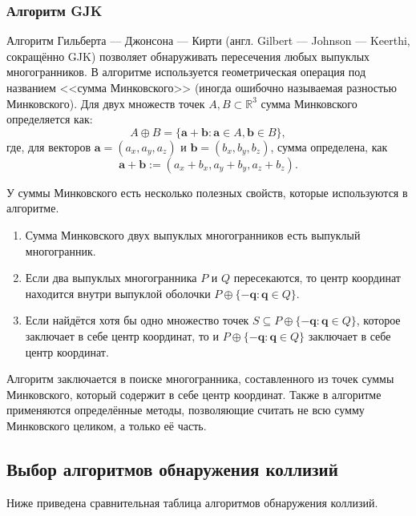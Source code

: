 \subsubsection{Алгоритм GJK}

Алгоритм Гильберта --- Джонсона --- Кирти (англ. Gilbert --- Johnson --- Keerthi, сокращённо GJK) позволяет обнаруживать пересечения любых выпуклых многогранников.
В алгоритме используется геометрическая операция под названием <<сумма Минковского>> (иногда ошибочно называемая разностью Минковского). %
Для двух множеств точек $A, B \subset \mathbb{R}^3$ сумма Минковского определяется как:
$$
A \oplus B = \{ \boldsymbol{a} + \boldsymbol{b} : \boldsymbol{a} \in A, \boldsymbol{b} \in B \},
$$
где, для векторов $\boldsymbol{a} = (a_x, a_y, a_z)$ и $\boldsymbol{b} = (b_x, b_y, b_z)$, сумма определена, как
$$
\boldsymbol{a} + \boldsymbol{b} := (a_x + b_x, a_y + b_y, a_z + b_z).
$$

У суммы Минковского есть несколько полезных свойств, которые используются в алгоритме.
\begin{enumerate}
    \item Сумма Минковского двух выпуклых многогранников есть выпуклый многогранник.
    \item Если два выпуклых многогранника $P$ и $Q$ пересекаются, то центр координат находится внутри выпуклой оболочки $P \oplus \{ -\boldsymbol{q} : \boldsymbol{q} \in Q \}$.
    \item Если найдётся хотя бы одно множество точек $S \subseteq P \oplus \{ -\boldsymbol{q} : \boldsymbol{q} \in Q \}$, которое заключает в себе центр координат, то и $P \oplus \{ -\boldsymbol{q} : \boldsymbol{q} \in Q \}$ заключает в себе центр координат.
\end{enumerate}

Алгоритм заключается в поиске многогранника, составленного из точек суммы Минковского, который содержит в себе центр координат.
Также в алгоритме применяются определённые методы, позволяющие считать не всю сумму Минковского целиком, а только её часть.

\subsection*{Выбор алгоритмов обнаружения коллизий}

Ниже приведена сравнительная таблица алгоритмов обнаружения коллизий.

